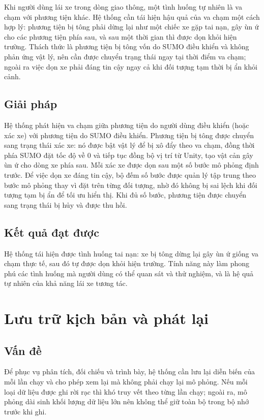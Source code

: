﻿\documentclass[../DoAn.tex]{subfiles}
\begin{document}
Khi người dùng lái xe trong dòng giao thông, một tình huống tự nhiên là va chạm
với phương tiện khác. Hệ thống cần tái hiện hậu quả của va chạm một cách hợp lý:
phương tiện bị tông phải dừng lại như một chiếc xe gặp tai nạn, gây ùn ứ cho các
phương tiện phía sau, và sau một thời gian thì được dọn khỏi hiện trường. Thách
thức là phương tiện bị tông vốn do \gls{SUMO} điều khiển và không phản ứng vật
lý, nên cần được chuyển trạng thái ngay tại thời điểm va chạm; ngoài ra việc dọn
xe phải đáng tin cậy ngay cả khi đối tượng tạm thời bị ẩn khỏi cảnh.

\subsection{Giải pháp}

Hệ thống phát hiện va chạm giữa phương tiện do người dùng điều khiển (hoặc xác xe)
với phương tiện do \gls{SUMO} điều khiển. Phương tiện bị tông được chuyển sang
trạng thái xác xe: nó được bật vật lý để bị xô đẩy theo va chạm, đồng thời phía
\gls{SUMO} đặt tốc độ về 0 và tiếp tục đồng bộ vị trí từ Unity, tạo vật cản gây
ùn ứ cho dòng xe phía sau. Mỗi xác xe
được dọn sau một số bước mô phỏng định trước. Để việc dọn xe đáng tin cậy, bộ đếm
số bước được quản lý tập trung theo bước mô phỏng thay vì đặt trên từng đối tượng,
nhờ đó không bị sai lệch khi đối tượng tạm bị ẩn để tối ưu hiển thị. Khi đủ số
bước, phương tiện được chuyển sang trạng thái bị hủy và được thu hồi.

\subsection{Kết quả đạt được}

Hệ thống tái hiện được tình huống tai nạn: xe bị tông dừng lại gây ùn ứ giống va
chạm thực tế, sau đó tự được dọn khỏi hiện trường. Tính năng này làm phong phú
các tình huống mà người dùng có thể quan sát và thử nghiệm, và là hệ quả tự nhiên
của khả năng lái xe tương tác.

\section{Lưu trữ kịch bản và phát lại}
\label{sec:luu-tru}

\subsection{Vấn đề}

Để phục vụ phân tích, đối chiếu và trình bày, hệ thống cần lưu lại diễn biến của
mỗi lần chạy và cho phép xem lại mà không phải chạy lại mô phỏng. Nếu mỗi loại dữ
liệu được ghi rời rạc thì khó truy vết theo từng lần chạy; ngoài ra, mô phỏng dài
sinh khối lượng dữ liệu lớn nên không thể giữ toàn bộ trong bộ nhớ trước khi ghi.
\end{document}
